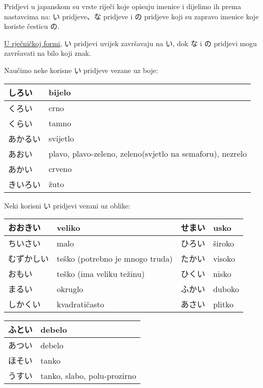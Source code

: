 
\author{Tomislav Mamić, Željka Ludošan}


	
	
	Pridjevi u japanskom su vrste riječi koje opisuju imenice i dijelimo ih prema nastavcima na: い pridjeve、な pridjeve i の pridjeve koji su zapravo imenice koje koriste česticu の.
	
\underline{U rječničkoj formi}, い pridjevi uvijek završavaju na い, dok な i の pridjevi mogu završavati na bilo koji znak.



Naučimo neke korisne い pridjeve vezane uz boje:

	\vspace{10pt}
	\begin{tabular}{|l|l|}
		\hline
		しろい&bijelo\\\hline
		くろい&crno\\\hline
		くらい&tamno\\\hline
		あかるい&svijetlo\\\hline
		あおい&plavo, plavo-zeleno, zeleno(svjetlo na semaforu), nezrelo\\\hline
		あかい&crveno\\\hline
		きいろい&žuto\\\hline
	\end{tabular}
	
\vspace{10pt}
Neki korisni い pridjevi vezani uz oblike:
	
	\vspace{10pt}
	\begin{tabular}{|l|l|l|l|}
		\hline
		おおきい&veliko&せまい&usko\\\hline
		ちいさい&malo&ひろい&široko\\\hline
		むずかしい&teško (potrebno je mnogo truda)&たかい&visoko\\\hline
		おもい&teško (ima veliku težinu)&ひくい&nisko\\\hline
		まるい&okruglo&ふかい&duboko\\\hline
		しかくい&kvadratičasto&あさい&plitko\\\hline
	\end{tabular}
	
	\vspace{10pt}
	\begin{tabular}{|l|l|}
		\hline
		ふとい&debelo\\\hline
		あつい&debelo\\\hline
		ほそい&tanko\\\hline
		うすい&tanko, slabo, polu-prozirno\\\hline
	\end{tabular}
	
